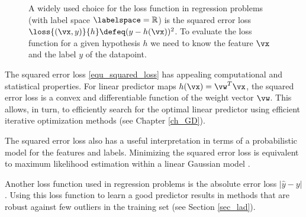 \documentclass[12pt]{report}
\begin{document}
\begin{figure}[htbp]
\begin{center}
     \vspace*{-4mm}
\end{center}
\caption{A widely used choice for the loss function in regression problems 
	(with label space $\labelspace=\mathbb{R}$) is the squared error loss $\loss{(\vx,y)}{h} \defeq (y - h(\vx))^{2}$. 
To evaluate the loss function for a given hypothesis $h$ we need to 
know the feature $\vx$ and the label $y$ of the datapoint.}
\label{fig_squarederror_loss}
\end{figure}

The squared error loss \eqref{equ_squared_loss} has appealing 
computational and statistical properties. For linear predictor 
maps $h(\vx) = \vw^{T} \vx$, the squared error loss is a 
convex and differentiable function of the weight vector $\vw$. 
This allows, in turn, to efficiently search for the optimal linear 
predictor using efficient iterative optimization methods (see Chapter \ref{ch_GD}). 

The squared error loss also has a useful interpretation in 
terms of a probabilistic model for the features and labels. 
Minimizing the squared error loss is equivalent to maximum 
likelihood estimation within a linear Gaussian model \cite[Sec. 2.6.3]{hastie01statisticallearning}. 

Another loss function used in regression problems is the absolute 
error loss $|\hat{y} - y|$. Using this loss function to learn a good 
predictor results in methods that are robust against few outliers in 
the training set (see Section \ref{sec_lad}).  
\end{document}
